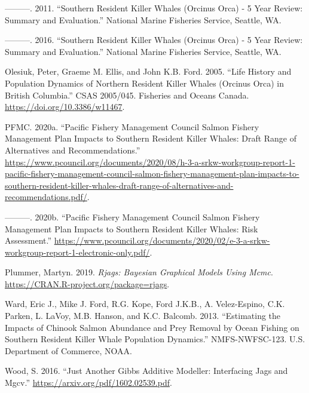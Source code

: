 \documentclass[]{article}
\begin{document}
\leavevmode\hypertarget{ref-nmfs2011}{}%
---------. 2011. ``Southern Resident Killer Whales (Orcinus Orca) - 5
Year Review: Summary and Evaluation.'' National Marine Fisheries
Service, Seattle, WA.

\leavevmode\hypertarget{ref-nmfs2016}{}%
---------. 2016. ``Southern Resident Killer Whales (Orcinus Orca) - 5
Year Review: Summary and Evaluation.'' National Marine Fisheries
Service, Seattle, WA.

\leavevmode\hypertarget{ref-olesiuk2005}{}%
Olesiuk, Peter, Graeme M. Ellis, and John K.B. Ford. 2005. ``Life
History and Population Dynamics of Northern Resident Killer Whales
(Orcinus Orca) in British Columbia.'' CSAS 2005/045. Fisheries and
Oceans Canada. \url{https://doi.org/10.3386/w11467}.

\leavevmode\hypertarget{ref-pfmc2020b}{}%
PFMC. 2020a. ``Pacific Fishery Management Council Salmon Fishery
Management Plan Impacts to Southern Resident Killer Whales: Draft Range
of Alternatives and Recommendations.''
\url{https://www.pcouncil.org/documents/2020/08/h-3-a-srkw-workgroup-report-1-pacific-fishery-management-council-salmon-fishery-management-plan-impacts-to-southern-resident-killer-whales-draft-range-of-alternatives-and-recommendations.pdf/}.

\leavevmode\hypertarget{ref-pfmc2020}{}%
---------. 2020b. ``Pacific Fishery Management Council Salmon Fishery
Management Plan Impacts to Southern Resident Killer Whales: Risk
Assessment.''
\url{https://www.pcouncil.org/documents/2020/02/e-3-a-srkw-workgroup-report-1-electronic-only.pdf/}.

\leavevmode\hypertarget{ref-plummer2019}{}%
Plummer, Martyn. 2019. \emph{Rjags: Bayesian Graphical Models Using
Mcmc}. \url{https://CRAN.R-project.org/package=rjags}.

\leavevmode\hypertarget{ref-ward2013}{}%
Ward, Eric J., Mike J. Ford, R.G. Kope, Ford J.K.B., A. Velez-Espino,
C.K. Parken, L. LaVoy, M.B. Hanson, and K.C. Balcomb. 2013. ``Estimating
the Impacts of Chinook Salmon Abundance and Prey Removal by Ocean
Fishing on Southern Resident Killer Whale Population Dynamics.''
NMFS-NWFSC-123. U.S. Department of Commerce, NOAA.

\leavevmode\hypertarget{ref-wood2016}{}%
Wood, S. 2016. ``Just Another Gibbs Additive Modeller: Interfacing Jags
and Mgcv.'' \url{https://arxiv.org/pdf/1602.02539.pdf}.
\end{document}
